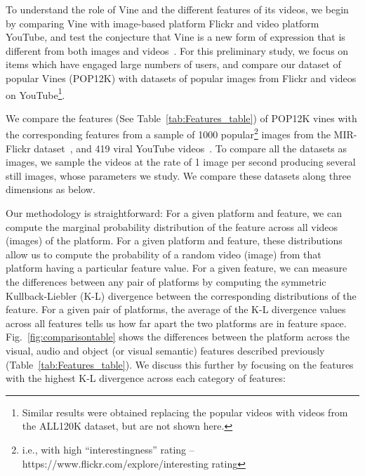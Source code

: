 
To understand the role of Vine and the different features of its videos, we begin by comparing Vine with image-based platform Flickr and video platform YouTube, and test the conjecture that Vine is a new form of expression that is different from both images and videos~\cite{pogue13}. For this preliminary study, we focus on items which have engaged large numbers of users, and compare our dataset of popular Vines (POP12K) with datasets of popular images from Flickr and videos on YouTube\footnote{Similar results were obtained replacing the popular videos with videos from the ALL120K dataset, but are not shown here.}.   

We compare the features (See Table~\ref{tab:Features_table}) of POP12K vines with the corresponding features from a sample of 1000 popular\footnote{i.e., with high  ``interestingness'' rating -- \scriptsize https://www.flickr.com/explore/interesting rating}  images from the MIR-Flickr dataset~\cite{huiskes08}, and 419 viral YouTube videos~\cite{Jiang:2014:VVS:2578726.2578754}. To compare all the datasets as images, we sample the videos at the rate of 1 image per second producing several still images, whose parameters we study. We compare these datasets along three dimensions as below.

Our methodology is straightforward: For a given platform and feature, we can compute the  marginal probability distribution of the feature across all videos (images) of the platform. For a given platform and feature, these distributions allow us to compute the probability of a random video (image) from that platform having a particular feature value. For a given feature, we can measure the differences between any pair of platforms by computing the symmetric Kullback-Liebler (K-L) divergence between the corresponding distributions of the feature. For a given pair of platforms, the average of the K-L divergence values across all features tells us how far apart the two platforms are in feature space. Fig.~\ref{fig:comparisontable} shows the differences between the platform across the visual, audio and object (or visual semantic) features described previously (Table~\ref{tab:Features_table}). We discuss this further by focusing on the features with the highest K-L divergence across each category of features: 

